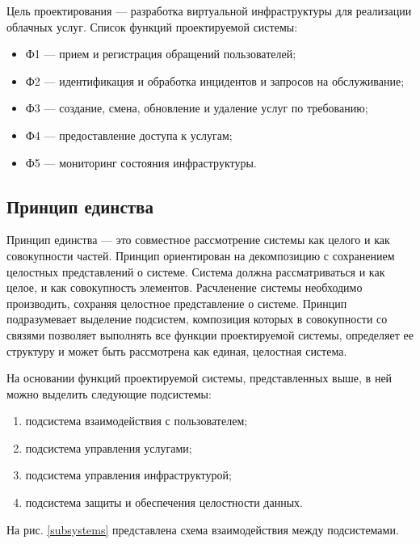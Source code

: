 Цель проектирования --- разработка виртуальной инфраструктуры для реализации облачных услуг.
Список функций проектируемой системы:
\begin{itemize}
  \item Ф1 --- прием и регистрация обращений пользователей;
  \item Ф2 --- идентификация и обработка инцидентов и запросов на обслуживание;
  \item Ф3 --- создание, смена, обновление и удаление услуг по требованию;
  \item Ф4 --- предоставление доступа к услугам;
  \item Ф5 --- мониторинг состояния инфраструктуры.
\end{itemize}

\subsection{Принцип единства}

Принцип единства --- это совместное рассмотрение системы как целого и как совокупности частей.
Принцип ориентирован на декомпозицию с сохранением целостных представлений о системе.
Система должна рассматриваться и как целое, и как совокупность элементов.
Расчленение системы необходимо производить, сохраняя целостное представление о системе.
Принцип подразумевает выделение подсистем, композиция которых в совокупности со связями позволяет выполнять все функции проектируемой системы, определяет ее структуру и может быть рассмотрена как единая, целостная система.

На основании функций проектируемой системы, представленных выше, в ней можно выделить следующие подсистемы:
\begin{enumerate}
  \item подсистема взаимодействия с пользователем;
  \item подсистема управления услугами;
  \item подсистема управления инфраструктурой;
  \item подсистема защиты и обеспечения целостности данных.
\end{enumerate}

На рис. \ref{subsystems} представлена схема взаимодействия между подсистемами.

